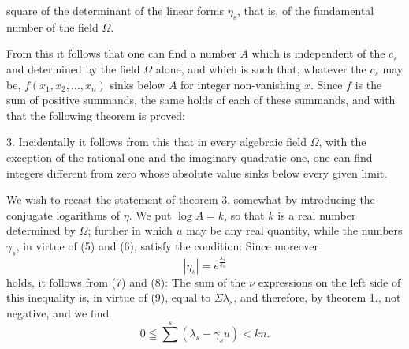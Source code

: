 square of the determinant of the linear forms $\eta_s$, that is, of the fundamental number of the field $\Omega$.

From this it follows that one can find a number $A$ which is independent of the $c_s$ and determined by the field $\Omega$ alone, and which is such that, whatever the $c_s$ may be, $f(x_1,x_2,\dots,x_n)$ sinks below $A$ for integer non-vanishing $x$. Since $f$ is the sum of positive summands, the same holds of each of these summands, and with that the following theorem is proved:

3. 
Incidentally it follows from this that in every algebraic field $\Omega$, with the exception of the rational one and the imaginary quadratic one, one can find integers different from zero whose absolute value sinks below every given limit.

We wish to recast the statement of theorem 3. somewhat by introducing the conjugate logarithms of $\eta$. We put $\log A = k$, so that $k$ is a real number determined by $\Omega$; further
in which $u$ may be any real quantity, while the numbers $\gamma_s$, in virtue of (5) and (6), satisfy the condition:
Since moreover
\[
|\eta_s| = e^{\frac{\lambda_s}{\delta_s}}
\]
holds, it follows from (7) and (8):
The sum of the $\nu$ expressions on the left side of this inequality is, in virtue of (9), equal to $\Sigma\lambda_s$, and therefore, by theorem 1., not negative, and we find
\[
0 \leqq \sum^{s} (\lambda_s - \gamma_s u) < k n.
\]
